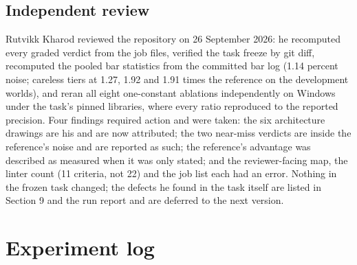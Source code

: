 \documentclass[11pt,letterpaper]{article}
\begin{document}
\subsection{Independent review}

Rutvikk Kharod reviewed the repository on 26 September 2026: he recomputed every graded verdict from the job files, verified the task freeze by git diff, recomputed the pooled bar statistics from the committed bar log (1.14 percent noise; careless tiers at 1.27, 1.92 and 1.91 times the reference on the development worlds), and reran all eight one-constant ablations independently on Windows under the task's pinned libraries, where every ratio reproduced to the reported precision. Four findings required action and were taken: the six architecture drawings are his and are now attributed; the two near-miss verdicts are inside the reference's noise and are reported as such; the reference's advantage was described as measured when it was only stated; and the reviewer-facing map, the linter count (11 criteria, not 22) and the job list each had an error. Nothing in the frozen task changed; the defects he found in the task itself are listed in Section 9 and the run report and are deferred to the next version.


\section{Experiment log}
\end{document}
